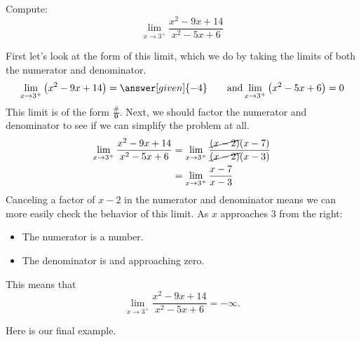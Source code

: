 \documentclass{ximera}
\begin{document}
\begin{example}
  Compute:
  \[
  \lim_{x\to 3^+} \frac{x^2-9x+14}{x^2-5x+6}
  \]
  \begin{explanation}
    First let's look at the form of this limit, which we do by taking the limits of both the numerator and denominator.
    \[
    \lim_{x\to 3^+} \left(x^2-9x+14\right) = \answer[given]{-4}\qquad\text{and}\lim_{x\to3^+}\left(x^2-5x+6\right) = 0
    \]
    This limit is of the form $\boldsymbol{\tfrac{\#}{0}}$. Next, we should factor the numerator and denominator to see if we can simplify the problem at all. 
    \begin{align*}
      \lim_{x\to 3^+}\frac{x^2-9x+14}{x^2-5x+6} &= \lim_{x\to 3^+}\frac{\cancel{(x-2)}(x-7)}{\cancel{(x-2)}(x-3)}\\
      &= \lim_{x\to 3^+}\frac{x-7}{x-3}
    \end{align*}
    Canceling a factor of $x-2$ in the numerator and denominator
    means we can more easily check the behavior of this limit.  As $x$
    approaches $3$ from the right:
    \begin{itemize}
    \item The numerator is a  number. 
    \item The denominator is  and approaching zero.
    \end{itemize}
    This means that
    \[
    \lim_{x\to 3^+} \frac{x^2-9x+14}{x^2-5x+6} = -\infty.
    \]
   \end{explanation}
\end{example}

Here is our final example.
\end{document}
